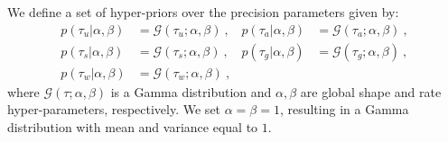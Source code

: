 We define a set of hyper-priors over the precision parameters given by:
\begin{align}
p( \tau_u | \alpha, \beta) & = \mathcal{G}(\tau_u ; \alpha, \beta ) \ , &
p( \tau_a | \alpha, \beta) & = \mathcal{G}(\tau_a ; \alpha, \beta ) \ , \nonumber \\
p( \tau_s | \alpha, \beta) & = \mathcal{G}(\tau_s ; \alpha, \beta ) \ , &  
p( \tau_g | \alpha, \beta) & = \mathcal{G}(\tau_g ; \alpha, \beta ) \ , \nonumber \\
p( \tau_w | \alpha, \beta) & = \mathcal{G}(\tau_w ; \alpha, \beta ) \ , 
\label{eq:hyper-params}
\end{align} 
where $\mathcal{G}(\tau ; \alpha, \beta)$ is a Gamma distribution and $\alpha, \beta$ are global shape and rate hyper-parameters, respectively.
We set $\alpha=\beta=1$, resulting in a Gamma distribution with mean and variance equal to $1$. 

